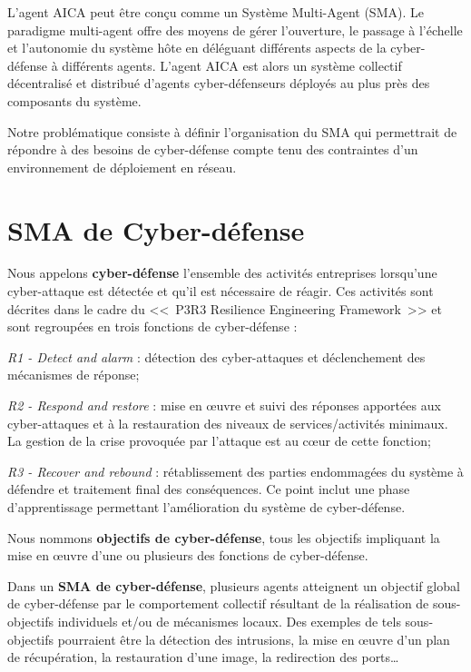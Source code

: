 L'agent AICA peut être conçu comme un Système Multi-Agent (SMA). Le paradigme multi-agent offre des moyens de gérer l'ouverture, le passage à l'échelle et l'autonomie du système hôte en déléguant différents aspects de la cyber-défense à différents agents. L'agent AICA  est alors un système collectif décentralisé et distribué d'agents cyber-défenseurs déployés au plus près des composants du système\cite{ieeesp_KottT20}.

Notre problématique consiste à définir l'organisation du SMA qui permettrait de répondre à des besoins de cyber-défense compte tenu des contraintes d'un environnement de déploiement en réseau.


\section{SMA de Cyber-défense}

Nous appelons \textbf{cyber-défense} l'ensemble des activités entreprises lorsqu'une cyber-attaque est détectée et qu'il est nécessaire de réagir\cite{theron_autonomous_2021}. Ces activités sont décrites dans le cadre du <<~P3R3 Resilience Engineering Framework~>>\cite{theron_p3r3_2021} et sont regroupées en trois fonctions de cyber-défense :

\textit{R1 - Detect and alarm} : détection des cyber-attaques  et déclenchement des mécanismes de réponse;

\textit{R2 - Respond and restore} : mise en œuvre et suivi des réponses apportées aux cyber-attaques et à la restauration des niveaux de services/activités minimaux. La gestion de la crise provoquée par l'attaque est au cœur de cette fonction;

\textit{R3 - Recover and rebound} : rétablissement des parties endommagées du système à défendre et traitement final des conséquences. Ce point inclut une phase d'apprentissage permettant l'amélioration du système de cyber-défense.


Nous nommons \textbf{objectifs de cyber-défense}, tous les objectifs impliquant la mise en œuvre d'une ou plusieurs des fonctions de cyber-défense.

Dans un \textbf{SMA de cyber-défense}, plusieurs agents atteignent un objectif global de cyber-défense par le comportement collectif résultant de la réalisation de sous-objectifs individuels et/ou de mécanismes locaux\cite{jamont2015meeting}. Des exemples de tels sous-objectifs pourraient être la détection des intrusions, la mise en œuvre d'un plan de récupération, la restauration d'une image, la redirection des ports\dots


